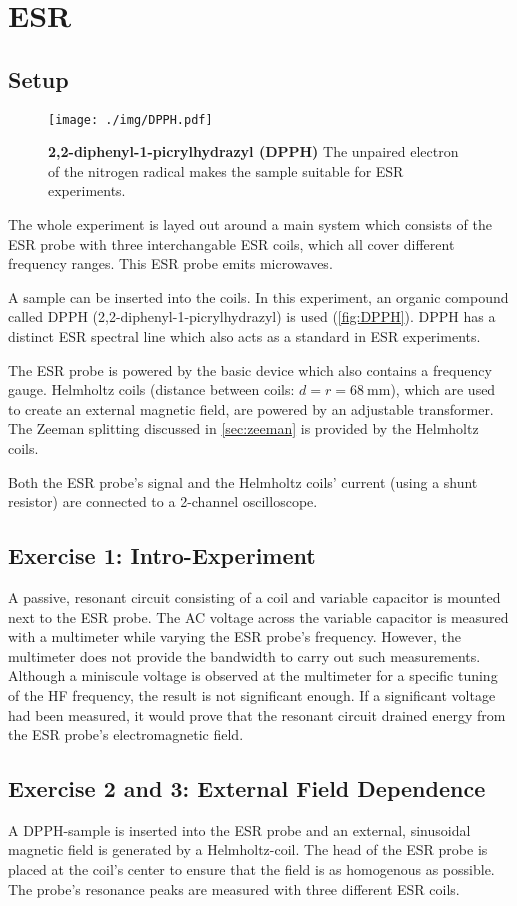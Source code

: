 \chapter{ESR}
\section{Setup}
\begin{figure}
	\centering
	\texttt{[image: ./img/DPPH.pdf]}
	\caption[]{\textbf{2,2-diphenyl-1-picrylhydrazyl (DPPH)} The unpaired electron of the nitrogen radical makes the sample suitable for ESR experiments.}
	\label{fig:DPPH}
\end{figure}
The whole experiment is layed out around a main system which consists of the ESR probe with three interchangable ESR coils, which all cover different frequency ranges.
This ESR probe emits microwaves.

A sample can be inserted into the coils.
In this experiment, an organic compound called DPPH (2,2-diphenyl-1-picrylhydrazyl) is used (\autoref{fig:DPPH}).
DPPH has a distinct ESR spectral line which also acts as a standard in ESR experiments.

The ESR probe is powered by the basic device which also contains a frequency gauge.
Helmholtz coils (distance between coils: $d=r=\SI{68}{\mm}$), which are used to create an external magnetic field, are powered by an adjustable transformer.
The Zeeman splitting discussed in \autoref{sec:zeeman} is provided by the Helmholtz coils.

Both the ESR probe's signal and the Helmholtz coils' current (using a shunt resistor) are connected to a 2-channel oscilloscope.

\section{Exercise 1: Intro-Experiment}
A passive, resonant circuit consisting of a coil and variable capacitor is mounted next to the ESR probe.
The AC voltage across the variable capacitor is measured with a multimeter while varying the ESR probe's frequency.
However, the multimeter does not provide the bandwidth to carry out such measurements.
Although a miniscule voltage is observed at the multimeter for a specific tuning of the HF frequency, the result is not significant enough.
If a significant voltage had been measured, it would prove that the resonant circuit drained energy from the ESR probe's electromagnetic field.

\section{Exercise 2 and 3: External Field Dependence}
A DPPH-sample is inserted into the ESR probe and an external, sinusoidal magnetic field is generated by a Helmholtz-coil.
The head of the ESR probe is placed at the coil's center to ensure that the field is as homogenous as possible.
The probe's resonance peaks are measured with three different ESR coils.

